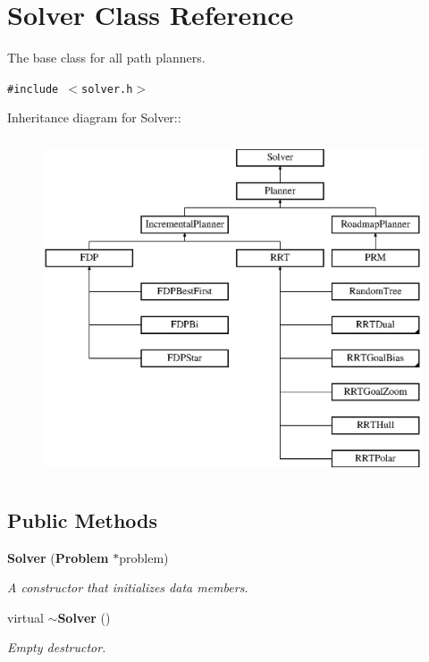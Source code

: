 \section{Solver  Class Reference}
\label{classSolver}
The base class for all path planners. 


{\tt \#include $<$solver.h$>$}

Inheritance diagram for Solver::\begin{figure}[H]
\begin{center}
\leavevmode
\includegraphics[height=10cm]{classSolver}
\end{center}
\end{figure}
\subsection*{Public Methods}
\begin{CompactItemize}
\item 
{\bf Solver} ({\bf Problem} $\ast$problem)
\begin{CompactList}\small\item\em A constructor that initializes data members.\item\end{CompactList}\item 
virtual {\bf $\sim$Solver} ()
\begin{CompactList}\small\item\em Empty destructor.\item\end{CompactList}\end{CompactItemize}
